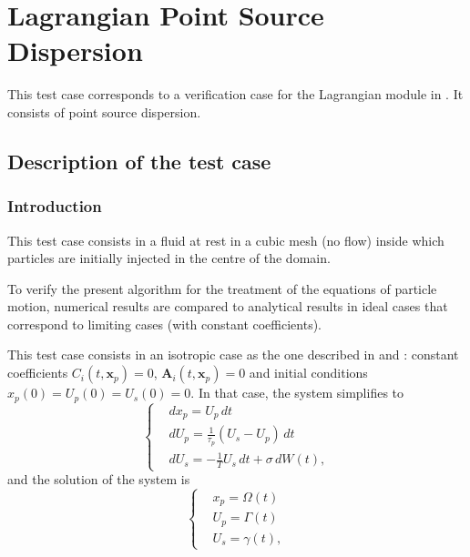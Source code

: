 \renewcommand{\IMAGES}{../LAGR_POINT_SOURCE_DISPERSION/IMAGES}

\newcommand{\lra}[1]{\langle #1 \rangle }
\chapter{Lagrangian Point Source Dispersion}
\label{LAGR:case:lagr_point_source_dispersion}

This test case corresponds to a verification case for the Lagrangian module in \CS.
It consists of point source dispersion.

\section{Description of the test case}
\subsection{Introduction}
This test case consists in a fluid at rest in a cubic mesh (no flow) inside which particles are initially injected  in the centre of the domain.

To verify the present algorithm for the treatment of the equations of particle motion, numerical results are compared to analytical results in ideal cases that correspond to limiting cases (with constant coefficients).

This test case consists in an isotropic case as the one described in \cite{Rep1} and \cite{Rep2}: constant coefficients $C_i(t,\mathbf{x}_p) = 0$, $\mathbf{A}_i(t,\mathbf{x}_p) = 0$ and initial conditions $x_p(0)=U_p(0)=U_s(0)=0$.
In that case, the system simplifies to
\begin{equation} \label{eq:lagr:num_schem:syst}
\left\{\begin{aligned}
& dx_p = U_p\, dt \\
& dU_p = \frac{1}{\tau_p}(U_s-U_p)\, dt \\
& dU_s = -\frac{1}{T}U_s\,dt + \sigma\, dW(t),
\end{aligned}\right.
\end{equation}
and the solution of the system is
\begin{equation} \label{eq:lagr:num_schem:solved}
\left\{\begin{aligned}
& x_p = \Omega(t) \\
& U_p = \Gamma(t) \\
& U_s = \gamma(t),
\end{aligned}\right.
\end{equation}

